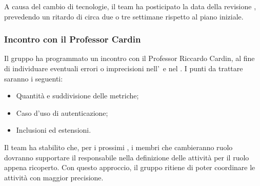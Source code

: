 \vspace{0.5\baselineskip}
\par A causa del cambio di tecnologie, il team ha posticipato la data della revisione , prevedendo un ritardo di circa due o tre settimane rispetto al piano iniziale.

\subsubsection{Incontro con il Professor Cardin}
\par Il gruppo ha programmato un incontro con il Professor Riccardo Cardin, al fine di individuare eventuali errori o imprecisioni nell'\AdR\ e nel \PdQ.
I punti da trattare saranno i seguenti:
\begin{itemize}
	\item Quantità e suddivisione delle metriche;
	\item Caso d'uso di autenticazione;
	\item Inclusioni ed estensioni.
\end{itemize}

\vspace{0.5\baselineskip}
\par Il team ha stabilito che, per i prossimi , i membri che cambieranno ruolo dovranno supportare il responsabile nella definizione delle attività per il ruolo appena ricoperto. Con questo approccio, il gruppo ritiene di poter coordinare le attività con maggior precisione.
